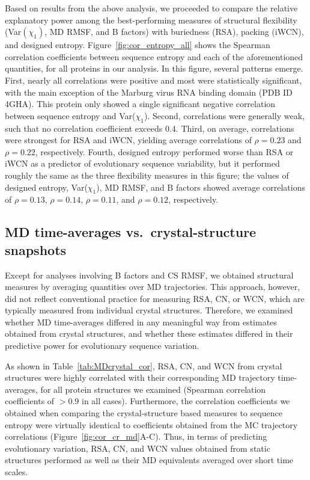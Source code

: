\documentclass[smallextended]{svjour3}
\begin{document}
Based on results from the above analysis, we proceeded to compare the relative explanatory power among the best-performing measures of structural flexibility (Var$(\chi_1)$, MD RMSF, and B factors) with buriedness (RSA), packing (iWCN), and designed entropy. Figure~\ref{fig:cor_entropy_all} shows the Spearman correlation coefficients between sequence entropy and each of the aforementioned quantities, for all proteins in our analysis. In this figure, several patterns emerge. First, nearly all correlations were positive and most were statistically significant, with the main exception of the Marburg virus RNA binding domain (PDB ID 4GHA). This protein only showed a single significant negative correlation between sequence entropy and Var($\chi_1$). Second, correlations were generally weak, such that no correlation coefficient exceeds 0.4. Third, on average, correlations were strongest for RSA and iWCN, yielding average correlations of $\rho=0.23$ and $\rho=0.22$, respectively. Fourth, designed entropy performed worse than RSA or iWCN as a predictor of evolutionary sequence variability, but it performed roughly the same as the three flexibility measures in this figure; the values of designed entropy, Var($\chi_1$), MD RMSF, and B factors showed average correlations of $\rho=0.13$, $\rho=0.14$, $\rho=0.11$, and $\rho=0.12$, respectively.


\subsection*{MD time-averages vs.\ crystal-structure snapshots}

Except for analyses involving B factors and CS RMSF, we obtained structural measures by averaging quantities over MD trajectories. This approach, however, did not reflect conventional practice for measuring RSA, CN, or WCN, which are typically measured from individual crystal structures. Therefore, we examined whether MD time-averages differed in any meaningful way from estimates obtained from crystal structures, and whether these estimates differed in their predictive power for evolutionary sequence variation.

As shown in Table~\ref{tab:MDcrystal_cor}, RSA, CN, and WCN from crystal structures were highly correlated with their corresponding MD trajectory time-averages, for all protein structures we examined (Spearman correlation coefficients of $>0.9$ in all cases). Furthermore, the correlation coefficients we obtained when comparing the crystal-structure based measures to sequence entropy were virtually identical to coefficients obtained from the MC trajectory correlations (Figure~\ref{fig:cor_cr_md}A-C). Thus, in terms of predicting evolutionary variation, RSA, CN, and WCN values obtained from static structures performed as well as their MD equivalents averaged over short time scales. 
\end{document}
